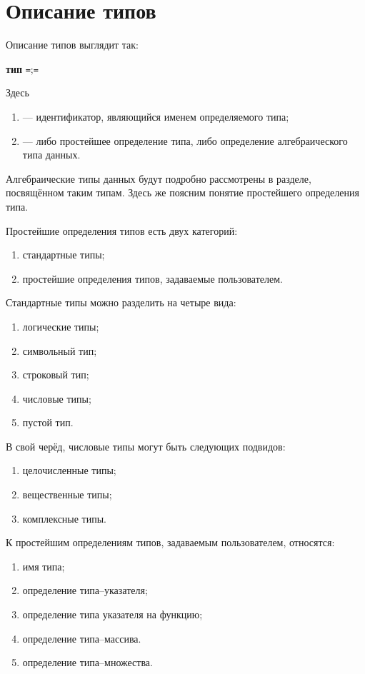 \documentclass[10pt]{report}
\begin{document}
\section{Описание типов}
Описание типов выглядит так:
\begin{center}
	\noindent\textbf{тип} \texttt{=}\rbo;\texttt{=}\rbc\kleene
\end{center}

Здесь 
\begin{enumerate}
	\item {} --- идентификатор, являющийся именем определяемого типа;
	\item {} --- либо простейшее определение типа, либо определение алгебраического типа данных.
\end{enumerate}

Алгебраические типы данных будут подробно рассмотрены в разделе, посвящённом таким типам. Здесь же поясним понятие простейшего определения типа.

Простейшие определения типов есть двух категорий:
\begin{enumerate}
	\item стандартные типы;
	\item простейшие определения типов, задаваемые пользователем.
\end{enumerate}

Стандартные типы можно разделить на четыре вида:
\begin{enumerate}
	\item логические типы;
	\item символьный тип;
	\item строковый тип;
	\item числовые типы;
	\item пустой тип.
\end{enumerate}

В свой черёд, числовые типы могут быть следующих подвидов:
\begin{enumerate}
	\item целочисленные типы;
	\item вещественные типы;
	\item комплексные типы.
\end{enumerate}

К простейшим определениям типов, задаваемым пользователем, относятся:
\begin{enumerate}
	\item имя типа;
	\item определение типа--указателя;
	\item определение типа указателя на функцию;
	\item определение типа--массива.
	\item определение типа--множества.
\end{enumerate}
\end{document}
